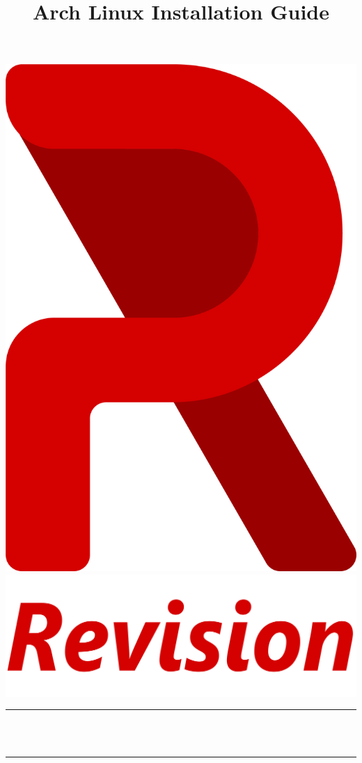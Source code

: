 \documentclass[titlepage]{article}
\title{Arch Linux Installation Guide} %
\makeatletter
\let\thetitle\@title
\makeatother
\begin{document}

\begin{titlepage}
    \centering
    \vspace*{0.5 cm}
    \includegraphics[scale = 0.2]{logo.png}\\	%
    \includegraphics[scale = 0.03]{revi.png}    
	\rule{\linewidth}{0.2 mm} \\[0.5 cm]
	{ \huge \bfseries \thetitle}\\
	\rule{\linewidth}{0.2 mm} \\[1.5 cm]
	  
\end{titlepage}
\end{document}
